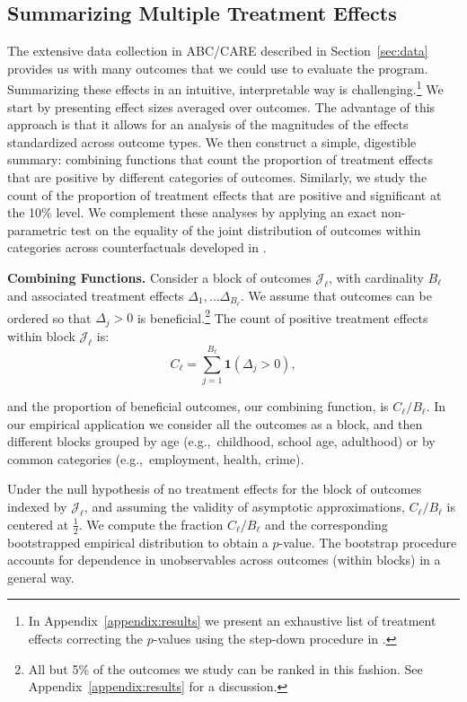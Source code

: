 \subsection{Summarizing Multiple Treatment Effects}\label{sec:combining-functions}

The extensive data collection in ABC/CARE described in Section~\ref{sec:data} provides us with many outcomes that we could use to evaluate the program. Summarizing these effects in an intuitive, interpretable way is challenging.\footnote{In Appendix~\ref{appendix:results} we present an exhaustive list of treatment effects correcting the $p$-values using the step-down procedure in \citet{Romano_Wolf_2016_pval_SaPL}.} We start by presenting effect sizes averaged over outcomes. The advantage of this approach is that it allows for an analysis of the magnitudes of the effects standardized across outcome types. We then construct a simple, digestible summary: combining functions that count the proportion of treatment effects that are positive by different categories of outcomes. Similarly, we study the count of the proportion of treatment effects that are positive and significant at the 10\% level. We complement these analyses by applying an exact non-parametric test on the equality of the joint distribution of outcomes within categories across counterfactuals developed in \citep{Rosenbaum_2005_Distribution_JRSS}.

\textbf{Combining Functions.} Consider a block of outcomes $\mathcal{J}_{\ell}$, with cardinality $B_{\ell}$ and  associated treatment effects $\Delta_1, \ldots \Delta_{B_\ell}$. We assume that outcomes can be ordered so that $\Delta_{j} >0$ is beneficial.\footnote{All but 5\% of the outcomes we study can be ranked in this fashion. See Appendix~\ref{appendix:results} for a discussion.} The count of positive treatment effects within block $\mathcal{J}_{\ell}$ is:
\begin{equation}
C_\ell = \sum^{B_\ell}_{j=1} \bm{1} (\Delta_{j} >0), 
\end{equation}

\noindent and the proportion of beneficial outcomes, our combining function, is $C_\ell / B_\ell$. In our empirical application we consider all the outcomes as a block, and then different blocks grouped by age (e.g.,\ childhood, school age, adulthood) or by common categories (e.g.,\ employment, health, crime).

Under the null hypothesis of no treatment effects for the block of outcomes indexed by $\mathcal{J}_\ell$, and assuming the validity of asymptotic approximations, $C_\ell / B_\ell$ is centered at $\frac{1}{2}$. We compute the fraction $C_\ell / B_\ell$ and the corresponding bootstrapped empirical distribution to obtain a $p$-value. The bootstrap procedure accounts for dependence in unobservables across outcomes (within blocks) in a general way. 

